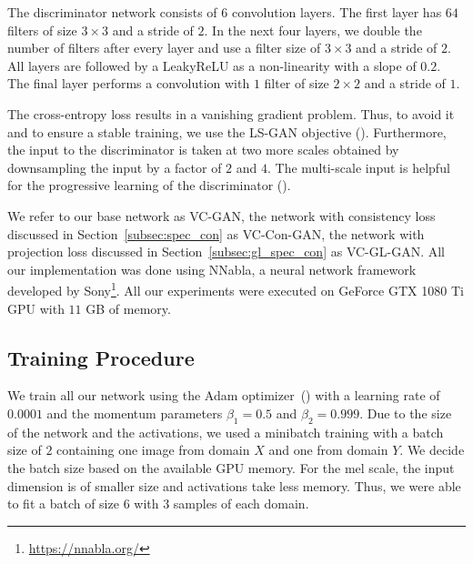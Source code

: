 The discriminator network consists of $6$ convolution layers. The first layer has $64$ filters of size $3\times 3$ and a stride of $2$. 
In the next four layers, we double the number of filters after every layer and use a filter size of $3\times 3$ and  a stride of $2$. All layers are followed by a LeakyReLU as a non-linearity with a slope of $0.2$. The final layer performs a convolution with $1$ filter of size $2\times 2$ and a stride of $1$. 

The cross-entropy loss results in a vanishing gradient problem. Thus, to avoid it and to ensure a stable training, we use the LS-GAN objective (\cite{mao2017least}). Furthermore, the input to the discriminator is taken at two more scales obtained by downsampling the input by a factor of $2$ and $4$. The multi-scale input is helpful for the progressive learning of the discriminator (\cite{wang2018high}).

We refer to our base network as VC-GAN, the network with consistency loss discussed in Section~\ref{subsec:spec_con} as VC-Con-GAN, the network with projection loss discussed in Section~\ref{subsec:gl_spec_con} as VC-GL-GAN. All our implementation was done using NNabla, a neural network framework developed by Sony\footnote{\url{https://nnabla.org/}}. All our experiments were executed on GeForce GTX 1080 Ti GPU with $11$ GB of memory.

\subsection{Training Procedure}
\label{subsec:train_prod}
We train all our network using the Adam optimizer~(\cite{kingma2014adam}) with a learning rate of $0.0001$ and the momentum parameters $\beta_1=0.5$ and $\beta_2=0.999$. Due to the size of the network and the activations, we used a minibatch training with a batch size of $2$ containing one image from domain $X$ and one from domain $Y$. We decide the batch size based on the available GPU memory. For the mel scale, the input dimension is of smaller size and activations take less memory. Thus, we were able to fit a batch of size $6$ with $3$ samples of each domain.


